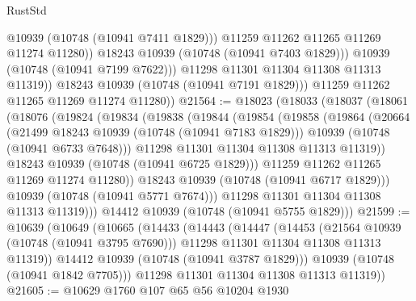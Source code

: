 \begin{lexlean}{RustStd}
\begin{coremodule}
{\begin{coremodule}
{{{{{                        @10939
                        (@10748 (@10941 @7411 @1829)))
                      @11259
                      @11262
                      @11265
                      @11269
                      @11274
                      @11280))
                  @18243
                  @10939
                  (@10748 (@10941 @7403 @1829)))
                @10939
                (@10748 (@10941 @7199 @7622)))
              @11298
              @11301
              @11304
              @11308
              @11313
              @11319))
          @18243
          @10939
          (@10748 (@10941 @7191 @1829)))
        @11259
        @11262
        @11265
        @11269
        @11274
        @11280))
@21564 := @18023
    (@18033
      (@18037
        (@18061
          (@18076
            (@19824
              (@19834
                (@19838
                  (@19844
                    (@19854
                      (@19858
                        (@19864
                          (@20664
                            (@21499 @18243 @10939 (@10748 (@10941 @7183 @1829)))
                            @10939
                            (@10748 (@10941 @6733 @7648)))
                          @11298
                          @11301
                          @11304
                          @11308
                          @11313
                          @11319))
                      @18243
                      @10939
                      (@10748 (@10941 @6725 @1829)))
                    @11259
                    @11262
                    @11265
                    @11269
                    @11274
                    @11280))
                @18243
                @10939
                (@10748 (@10941 @6717 @1829)))
              @10939
              (@10748 (@10941 @5771 @7674)))
            @11298
            @11301
            @11304
            @11308
            @11313
            @11319)))
      @14412
      @10939
      (@10748 (@10941 @5755 @1829)))
@21599 := @10639
    (@10649
      (@10665
        (@14433
          (@14443
            (@14447
              (@14453
                (@21564 @10939 (@10748 (@10941 @3795 @7690)))
                @11298
                @11301
                @11304
                @11308
                @11313
                @11319))
            @14412
            @10939
            (@10748 (@10941 @3787 @1829)))
          @10939
          (@10748 (@10941 @1842 @7705)))
        @11298
        @11301
        @11304
        @11308
        @11313
        @11319))
@21605 := @10629 @1760 @107 @65 @56 @10204 @1930
}}}}}
\end{coremodule}}
\end{coremodule}
\end{lexlean}
